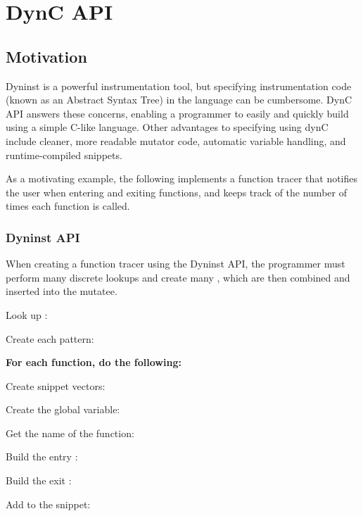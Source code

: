 \section{DynC API}
\subsection{Motivation}
Dyninst is a powerful instrumentation tool, but specifying instrumentation code
(known as an Abstract Syntax Tree) in the  language can be
cumbersome. DynC API answers these concerns, enabling a programmer to easily and
quickly build  using a simple C-like language. Other
advantages to specifying  using dynC include cleaner,
more readable mutator code, automatic variable handling, and runtime-compiled
snippets.

As a motivating example, the following implements a function tracer that
notifies the user when entering and exiting functions, and keeps track of the
number of times each function is called.

\subsubsection{Dyninst API}

When creating a function tracer using the Dyninst API, the programmer must
perform many discrete lookups and create many ,
which are then combined and inserted into the mutatee.

\noindent Look up :



\noindent Create each  pattern:


\noindent \textbf{For each function, do the following:}

Create snippet vectors:


Create the  global variable:


Get the name of the function:


Build the entry :


Build the exit :


Add  to the snippet:


